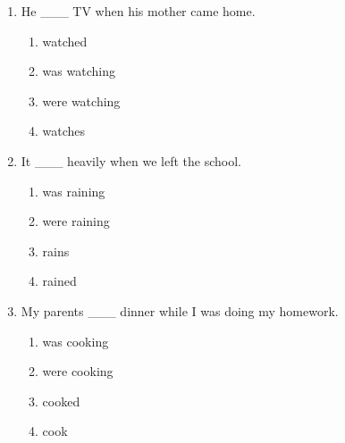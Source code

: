 \documentclass[11pt,a4paper]{ctexart}
\begin{document}
\begin{enumerate}[leftmargin=*,itemsep=4pt]
\begin{enumerate}[label=\Alph*.,leftmargin=2em,itemsep=1pt,topsep=2pt]
\item Do
\item Did
\end{enumerate}
\item He \_\_\_ TV when his mother came home.
\begin{enumerate}[label=\Alph*.,leftmargin=2em,itemsep=1pt,topsep=2pt]
\item watched
\item was watching
\item were watching
\item watches
\end{enumerate}
\item It \_\_\_ heavily when we left the school.
\begin{enumerate}[label=\Alph*.,leftmargin=2em,itemsep=1pt,topsep=2pt]
\item was raining
\item were raining
\item rains
\item rained
\end{enumerate}
\item My parents \_\_\_ dinner while I was doing my homework.
\begin{enumerate}[label=\Alph*.,leftmargin=2em,itemsep=1pt,topsep=2pt]
\item was cooking
\item were cooking
\item cooked
\item cook
\end{enumerate}
\end{enumerate}
\end{document}
